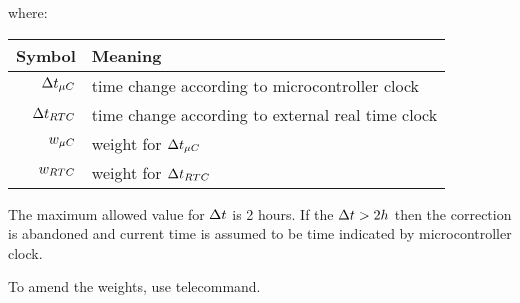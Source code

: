 where:

\begin{tabular}{r | l}
	Symbol & Meaning \\
	\hline
	$\Delta t_{\mu C}$ & time change according to microcontroller clock \\ 
	$\Delta t_{RTC}$ & time change according to external real time clock \\
	\label{sec:time-wMcu} $w_{\mu C}$ & weight for $\Delta t_{\mu C}$ \\
	\label{sec:time-wRtc} $w_{RTC}$ & weight for $\Delta t_{RTC}$ \\
\end{tabular}

The maximum allowed value for $\Delta t$ is 2 hours. If the $\Delta t > 2 h$ then the correction is abandoned and current time is assumed to be time indicated by microcontroller clock.

To amend the weights, use  telecommand.